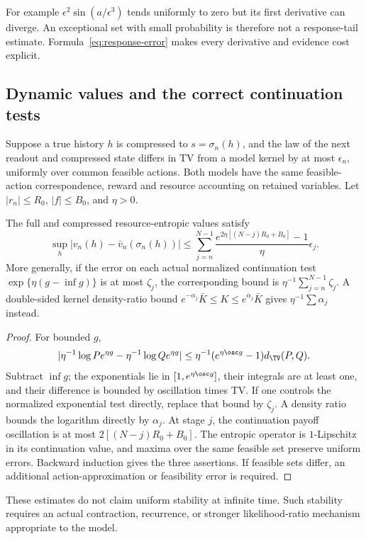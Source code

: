 For example $\epsilon^2\sin(a/\epsilon^3)$ tends uniformly to zero but its first derivative can diverge. An exceptional set with small probability is therefore not a response-tail estimate. Formula~\eqref{eq:response-error} makes every derivative and evidence cost explicit.

\subsection{Dynamic values and the correct continuation tests}
Suppose a true history $h$ is compressed to $s=\sigma_n(h)$, and the law of the next readout and compressed state differs in TV from a model kernel by at most $\epsilon_n$, uniformly over common feasible actions. Both models have the same feasible-action correspondence, reward and resource accounting on retained variables. Let $|r_n|\le R_0$, $|f|\le B_0$, and $\eta>0$.

\begin{theorem}\label{thm:value-error}
The full and compressed resource-entropic values satisfy
\[
 \sup_h|v_n(h)-\bar v_n(\sigma_n(h))|
 \le\sum_{j=n}^{N-1}\frac{e^{2\eta[(N-j)R_0+B_0]}-1}{\eta}\epsilon_j.
\]
More generally, if the error on each actual normalized continuation test
$\exp\{\eta(g-\inf g)\}$ is at most $\zeta_j$, the corresponding bound is $\eta^{-1}\sum_{j=n}^{N-1}\zeta_j$. A double-sided kernel density-ratio bound $e^{-\alpha_j}\bar K\le K\le e^{\alpha_j}\bar K$ gives $\eta^{-1}\sum\alpha_j$ instead.
\end{theorem}
\begin{proof}
For bounded $g$,
\[
 |\eta^{-1}\log Pe^{\eta g}-\eta^{-1}\log Qe^{\eta g}|
 \le\eta^{-1}(e^{\eta\osc g}-1)d_{\TV}(P,Q).
\]
Subtract $\inf g$; the exponentials lie in $[1,e^{\eta\osc g}]$, their integrals are at least one, and their difference is bounded by oscillation times TV. If one controls the normalized exponential test directly, replace that bound by $\zeta_j$. A density ratio bounds the logarithm directly by $\alpha_j$. At stage $j$, the continuation payoff oscillation is at most $2[(N-j)R_0+B_0]$. The entropic operator is $1$-Lipschitz in its continuation value, and maxima over the same feasible set preserve uniform errors. Backward induction gives the three assertions. If feasible sets differ, an additional action-approximation or feasibility error is required.
\end{proof}

These estimates do not claim uniform stability at infinite time. Such stability requires an actual contraction, recurrence, or stronger likelihood-ratio mechanism appropriate to the model.
\par
